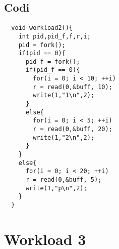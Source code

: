 \documentclass{article}
\begin{document}
\subsection{Codi}
\begin{lstlisting}
  void workload2(){
    int pid,pid_f,f,r,i;
    pid = fork();
    if(pid == 0){
      pid_f = fork();
      if(pid_f == 0){
        for(i = 0; i < 10; ++i)
        r = read(0,&buff, 10);
        write(1,"1\n",2);
      }
      else{
        for(i = 0; i < 5; ++i)
        r = read(0,&buff, 20);
        write(1,"2\n",2);
      }
    }
    else{
      for(i = 0; i < 20; ++i)
      r = read(0,&buff, 5);
      write(1,"p\n",2);
    }
  }
\end{lstlisting}

\section{Workload 3}
\end{document}
